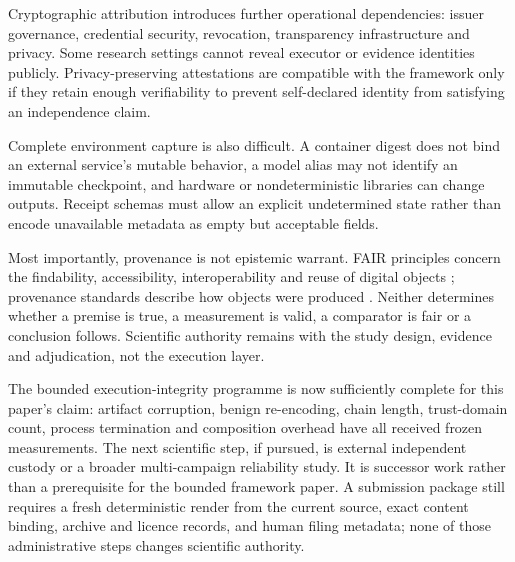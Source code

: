 Cryptographic attribution introduces further operational dependencies: issuer
governance, credential security, revocation, transparency infrastructure and
privacy. Some research settings cannot reveal executor or evidence identities
publicly. Privacy-preserving attestations are compatible with the framework only
if they retain enough verifiability to prevent self-declared identity from
satisfying an independence claim.

Complete environment capture is also difficult. A container digest does not bind
an external service's mutable behavior, a model alias may not identify an immutable
checkpoint, and hardware or nondeterministic libraries can change outputs. Receipt
schemas must allow an explicit undetermined state rather than encode unavailable
metadata as empty but acceptable fields.

Most importantly, provenance is not epistemic warrant. FAIR principles concern the
findability, accessibility, interoperability and reuse of digital objects
\citep{wilkinson2016fair}; provenance standards describe how objects were produced
\citep{moreau2013prov}. Neither determines whether a premise is true, a measurement
is valid, a comparator is fair or a conclusion follows. Scientific authority
remains with the study design, evidence and adjudication, not the execution layer.

The bounded execution-integrity programme is now sufficiently complete for this
paper's claim: artifact corruption, benign re-encoding, chain length, trust-domain
count, process termination and composition overhead have all received frozen
measurements. The next scientific step, if pursued, is external independent custody
or a broader multi-campaign reliability study. It is successor work rather than a
prerequisite for the bounded framework paper. A submission package still requires a
fresh deterministic render from the current source, exact content binding, archive
and licence records, and human filing metadata; none of those administrative steps
changes scientific authority.
